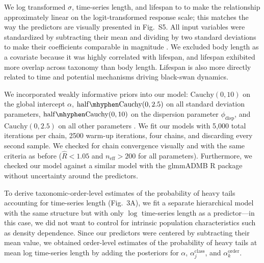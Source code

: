 \documentclass[9pt,twocolumn,twoside]{pnas-new}
\newcommand{\figcorrelates}{{5}}
\begin{document}
{We log transformed \(\sigma\), time-series length, and lifespan to
to make the
relationship approximately linear on the logit-transformed response scale;
this matches the way the predictors are visually presented in
Fig.~S\figcorrelates.
All input variables were standardized by subtracting their mean and dividing by two
standard deviations to make their coefficients comparable in
magnitude \cite{gelman2008c}. We excluded body length as a covariate because it
was highly correlated with lifespan, and lifespan exhibited more overlap across
taxonomy than body length. Lifespan is also more directly related to time and
potential mechanisms driving black-swan dynamics.

We incorporated weakly informative priors into our model: \(\mathrm{Cauchy}(0,
10)\) on the global intercept \(\alpha\), \(\mathrm{half\mhyphen Cauchy}(0,
2.5)\) on all standard deviation parameters, \(\mathrm{half\mhyphen Cauchy}(0,
10)\) on the dispersion parameter \(\phi_\mathrm{disp}\), and
\(\mathrm{Cauchy}(0, 2.5)\) on all other parameters \cite{gelman2006c,
gelman2008d}.
We fit our
models with 5,000 total iterations per chain, 2500 warm-up iterations, four
chains, and discarding every second sample. We checked for chain convergence
visually and with the same criteria as before (\(\widehat{R} < 1.05\) and
\(n_\mathrm{eff} >200\) for all parameters). Furthermore, we checked our model
against a similar model with the glmmADMB \textsf{R} package \cite{glmmadmb}
without uncertainty around the predictors.

To derive taxonomic-order-level estimates of the probability of heavy tails
accounting for time-series length (Fig.~3A), we fit a separate hierarchical
model with the same structure but with only \(\log\) time-series length as a
predictor---in this case, we did not want to control for intrinsic population
characteristics such as density dependence. Since our predictors were centered
by subtracting their mean value, we obtained order-level estimates of the
probability of heavy tails at mean log time-series length by adding the
posteriors for \(\alpha\), \(\alpha^\mathrm{class}_j\), and
\(\alpha^\mathrm{order}_k\).

}
\end{document}
